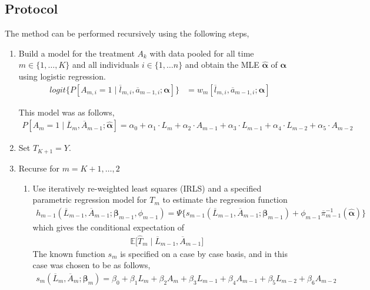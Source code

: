 \subsection{Protocol} 
The method can be performed recursively using the following steps, 

\begin{enumerate}
\item Build a model for the treatment $A_k$ with data pooled for all time $m \in \{1, \dots, K \}$ and all individuals $i \in \{1, \dots n\}$ and obtain the MLE $\hat{\mathbf{\alpha}}$ of $\mathbf{\alpha}$ using logistic regression. 
\begin{align} 
logit\{P[A_{m,i} = 1 \mid \overline{l}_{m,i}, \overline{a}_{m-1,i}; \mathbf{\alpha}]\} &= w_m [\overline{l}_{m,i}, \overline{a}_{m-1,i}; \mathbf{\alpha}]
\end{align} 

This model was as follows,  
\begin{align} 
P[A_m =1 \mid \overline{L}_m, \overline{A}_{m-1}; \hat{\mathbf{\alpha}}] = \alpha_{0} + \alpha_{1} \cdot L_{m} + \alpha_{2} \cdot A_{m-1} + \alpha_{3} \cdot L_{m-1} + \alpha_{4} \cdot L_{m-2} + \alpha_{5} \cdot A_{m-2} 
\end{align} 

\item Set $\hat{T}_{K+1} = Y$.  

\item Recurse for $m = K+1, \dots, 2$ 
\begin{enumerate}
\item \label{modcreate} Use iteratively re-weighted least squares (IRLS) and a specified parametric regression model for $T_m$ to estimate the regression function
\begin{align}
h_{m-1}(\overline{L}_{m-1}, \overline{A}_{m-1}; \mathbf{\beta}_{m-1}, \phi_{m-1}) = \Psi \{s_{m-1}(\overline{L}_{m-1}, \overline{A}_{m-1}; \mathbf{\beta}_{m-1}) + \phi_{m-1} \overline{\pi}_{m-1}^{-1} (\hat{\mathbf{\alpha}}) \} \label{eq:22}
\end{align}
which gives the conditional expectation of 
\begin{align}
\mathbb{E} \bigg[\hat{T}_m \mid \overline{L}_{m-1}, \overline{A}_{m-1} \bigg]
\end{align} 
The known function $s_{m}$ is specified on a case by case basis, and in this case was chosen to be as follows,   
\begin{align}
s_{m}(\overline{L}_{m}, \overline{A}_{m};\mathbf{\beta}_{m}) = \beta_0 + \beta_1 L_{m} +\beta_2 A_{m} + \beta_3 L_{m-1} +\beta_4 A_{m-1}+ \beta_5 L_{m-2} +\beta_6 A_{m-2}
\end{align}


\end{enumerate}
\end{enumerate}
